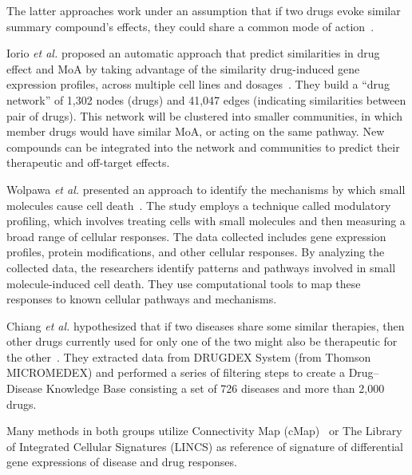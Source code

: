 The latter approaches work under an assumption that if two drugs evoke similar summary compound's effects, they could share a common mode of action~\cite{iorio2010identification, iorio2010discovery, wolpaw2011modulatory,  chiang2009systematic}. 

Iorio \textit{et al.} proposed an automatic approach that predict similarities in drug effect and MoA by taking advantage of the similarity drug-induced gene expression profiles, across multiple cell lines and dosages~\cite{iorio2010identification, iorio2010discovery}.
They build a “drug network” of 1,302 nodes (drugs) and 41,047 edges (indicating similarities between pair of drugs). This network will be clustered into smaller communities, in which member drugs would have similar MoA, or acting on the same pathway. New compounds can be integrated into the network and communities to predict their therapeutic and off-target effects.

Wolpawa \textit{et al.} presented an approach to identify the mechanisms by which small molecules cause cell death~\cite{wolpaw2011modulatory}. The study employs a technique called modulatory profiling, which involves treating cells with small molecules and then measuring a broad range of cellular responses. The data collected includes gene expression profiles, protein modifications, and other cellular responses. By analyzing the collected data, the researchers identify patterns and pathways involved in small molecule-induced cell death. They use computational tools to map these responses to known cellular pathways and mechanisms.

Chiang \textit{et al.} hypothesized that if two diseases share some similar therapies, then other drugs currently used for only one of the two might also be therapeutic for the other~\cite{chiang2009systematic}. They extracted data from DRUGDEX System (from Thomson MICROMEDEX) and performed a series of filtering steps to create a Drug–Disease Knowledge Base consisting a set of 726 diseases and more than 2,000 drugs.

Many methods in both groups utilize Connectivity Map (cMap)~\cite{lamb2007connectivity, lamb2006connectivity} or The Library of Integrated Cellular Signatures (LINCS) as reference of signature of differential gene expressions of disease and drug responses. 

